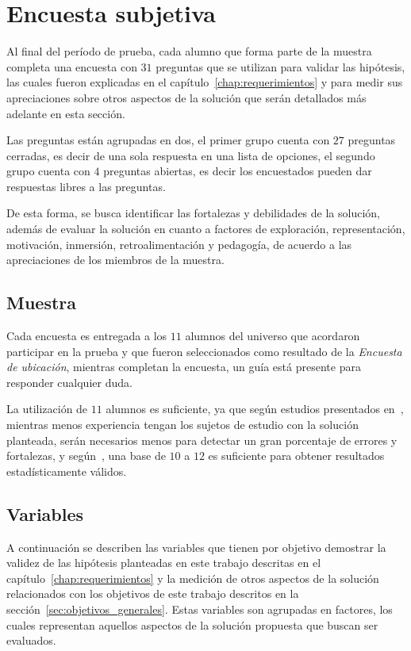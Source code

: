 
\section{Encuesta subjetiva}
\label{sec:subjetiva}

Al final del período de prueba, cada alumno que forma parte de la muestra
completa una encuesta con $31$ preguntas que se utilizan para validar las
hipótesis, las cuales fueron explicadas en el capítulo~\ref{chap:requerimientos}
y para medir sus apreciaciones sobre otros aspectos de la solución que serán
detallados más adelante en esta sección. 

Las preguntas están agrupadas en dos, el primer grupo cuenta con $27$ preguntas
cerradas, es decir de una sola respuesta en una lista de opciones, el segundo
grupo cuenta con $4$ preguntas abiertas, es decir los encuestados pueden dar
respuestas libres a las preguntas. 

De esta forma, se busca identificar las fortalezas y debilidades de la solución,
además de evaluar la solución en cuanto a factores de exploración,
representación, motivación, inmersión, retroalimentación y pedagogía, de acuerdo
a las apreciaciones de los miembros de la muestra.

\subsection{Muestra}

Cada encuesta es entregada a los $11$ alumnos del universo que acordaron
participar en la prueba y que fueron seleccionados como resultado de la 
\emph{Encuesta de ubicación}, mientras completan la encuesta, un guía está presente
para responder cualquier duda.

La utilización de $11$ alumnos es suficiente, ya que según estudios presentados
en~\cite{nielsen2000}, mientras menos experiencia tengan los sujetos de estudio
con la solución planteada, serán necesarios menos para detectar un gran
porcentaje de errores y fortalezas, y según~\cite{ritch2009}, una base de $10$ a
$12$ es suficiente para obtener resultados estadísticamente válidos.

\subsection{Variables}
\label{sec:variables}

A continuación se describen las variables que tienen por objetivo demostrar la
validez de las hipótesis planteadas en este trabajo descritas en el
capítulo~\ref{chap:requerimientos} y la medición de otros aspectos de la
solución relacionados con los objetivos de este trabajo descritos en la
sección~\ref{sec:objetivos_generales}. Estas variables son agrupadas en
factores, los cuales representan aquellos aspectos de la solución propuesta que
buscan ser evaluados.

